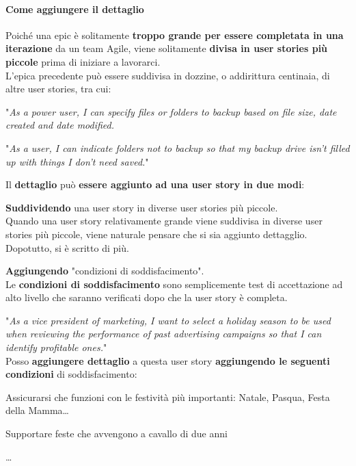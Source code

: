 \documentclass[10pt]{article}
\begin{document}
\paragraph{Come aggiungere il dettaglio}
Poiché una epic è solitamente \textbf{troppo grande per essere completata in una iterazione} da un team Agile, viene solitamente \textbf{divisa in user stories più piccole} prima di iniziare a lavorarci.\\
L'epica precedente può essere suddivisa in dozzine, o addirittura centinaia, di altre user stories, tra cui:
\begin{list}{}{}
\item "\textit{As a power user, I can specify files or folders to backup based on file size, date created and date modified.}
\item "\textit{As a user, I can indicate folders not to backup so that my backup drive isn't filled up with things I don't need saved.}"
\end{list}
\pagebreak
Il \textbf{dettaglio} può \textbf{essere aggiunto ad una user story in due modi}:
\begin{list}{}{}
\item \textbf{Suddividendo} una user story in diverse user stories più piccole.\\
Quando una user story relativamente grande viene suddivisa in diverse user stories più piccole, viene naturale pensare che si sia aggiunto dettagglio. Dopotutto, si è scritto di più.
\item \textbf{Aggiungendo} "condizioni di soddisfacimento".\\
Le \textbf{condizioni di soddisfacimento} sono semplicemente test di accettazione ad alto livello che saranno verificati dopo che la user story è completa.
\end{list}
"\textit{As a vice president of marketing, I want to select a holiday season to be used when reviewing the performance of past advertising campaigns so that I can identify profitable ones.}"\\
Posso \textbf{aggiungere dettaglio} a questa user story \textbf{aggiungendo le seguenti condizioni} di soddisfacimento:
\begin{list}{-}{}
\item Assicurarsi che funzioni con le festività più importanti: Natale, Pasqua, Festa della Mamma\ldots
\item Supportare feste che avvengono a cavallo di due anni
\item \ldots
\end{list}
\end{document}
